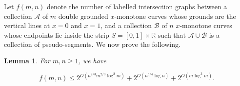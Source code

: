 \documentclass[11pt]{article}
\theoremstyle{plain}
\newtheorem{lemma}[theorem]{Lemma}
\theoremstyle{definition}
\theoremstyle{remark}
\begin{document}
 




Let $f(m,n)$ denote the number of labelled intersection graphs between a collection $\mathcal{A}$ of $m$ double grounded $x$-monotone curves whose grounds are the vertical lines at $x = 0$ and $x = 1$, and a collection $\mathcal{B}$ of $n$ $x$-monotone curves whose endpoints lie inside the strip $S = [0,1]\times \mathbb{R}$ such that  $\mathcal{A}\cup \mathcal{B}$ is a collection of pseudo-segments.  We now prove the following.


\begin{lemma}\label{abpart}
For $m,n\geq 1$, we have

    $$f(m,n) \leq  2^{O(n^{2/3}m^{2/3}\log^2 m)} + 2^{O(n^{5/4}\log n)} + 2^{O(m\log^3m)}.$$
\end{lemma}
\end{document}
